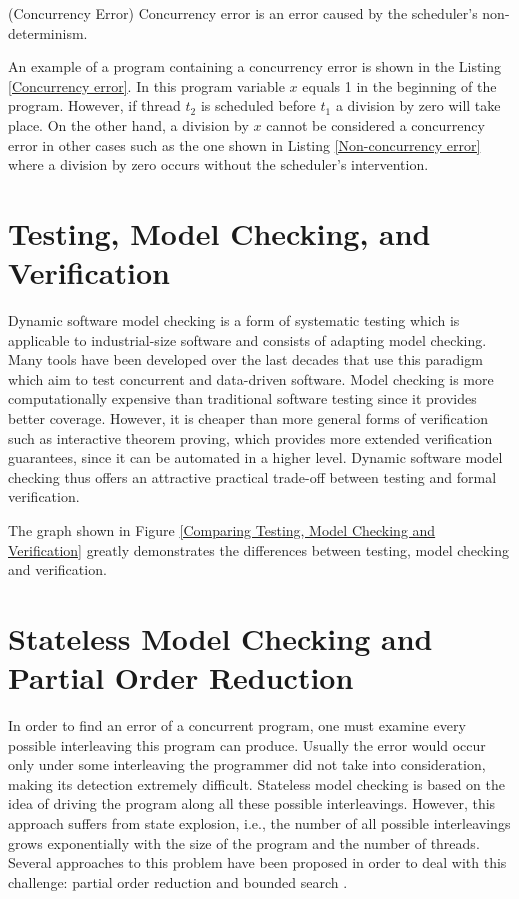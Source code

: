 \begin{definition}{(Concurrency Error)}
    Concurrency error is an error caused by the scheduler's non-determinism.
\end{definition}

An example of a program containing a concurrency error is shown in the Listing \ref{Concurrency error}. In this program variable $x$ equals 1 in the beginning of the program. However,
if thread $t_2$ is scheduled before $t_1$ a division by zero will take place. On the other hand, a division by $x$ cannot be considered a concurrency error in other cases
such as the one shown in Listing \ref{Non-concurrency error} where a division by zero occurs without the scheduler's intervention.


\section{Testing, Model Checking, and Verification}

Dynamic software model checking is a form of systematic testing which is applicable to industrial-size software and consists of adapting model checking.
Many tools have been developed over the last decades that use this paradigm which aim to test concurrent and data-driven software. Model checking is more computationally
expensive than traditional software testing since it provides better coverage. However, it is cheaper than more general forms of verification such as interactive theorem
proving, which provides more extended verification guarantees, since it can be automated in a higher level.
Dynamic software model checking thus offers an attractive practical trade-off between testing and formal verification. 

The graph shown in Figure \ref{Comparing Testing, Model Checking and Verification} \cite{TestingvsVerification} greatly demonstrates the differences between testing, model checking and verification.


\section{Stateless Model Checking and Partial Order Reduction}

In order to find an error of a concurrent program, one must examine every possible interleaving this program can produce. Usually the error 
would occur only under some interleaving the programmer did not take into consideration, making its detection extremely difficult. Stateless model checking is based on the idea of driving 
the program along all these possible interleavings. However, this approach suffers from state explosion, i.e., the number of all possible interleavings grows 
exponentially with the size of the program and the number of threads. Several approaches to this problem have been proposed in order to deal with this challenge: 
partial order reduction \cite{Godefroid1996} and bounded search \cite{BPOR}. 

